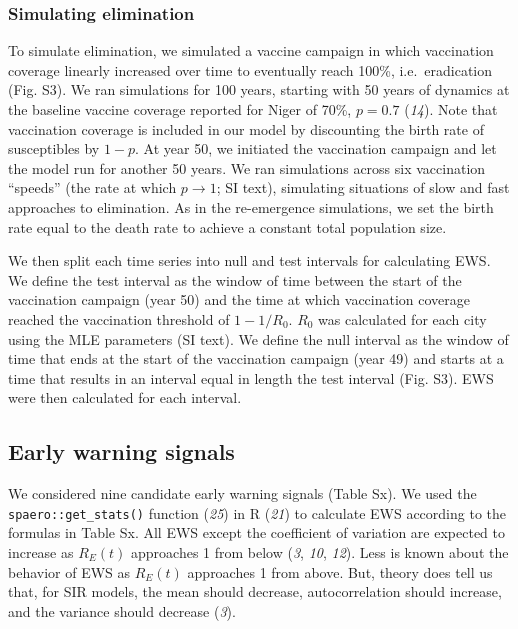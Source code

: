 \documentclass[3p]{elsarticle} %
\begin{document}
\subsubsection{Simulating elimination}\label{simulating-elimination}

To simulate elimination, we simulated a vaccine campaign in which
vaccination coverage linearly increased over time to eventually reach
100\%, i.e.~eradication (Fig. S3). We ran simulations for 100 years,
starting with 50 years of dynamics at the baseline vaccine coverage
reported for Niger of 70\%, \(p = 0.7\) (\emph{14}). Note that
vaccination coverage is included in our model by discounting the birth
rate of susceptibles by \(1-p\). At year 50, we initiated the
vaccination campaign and let the model run for another 50 years. We ran
simulations across six vaccination ``speeds'' (the rate at which
\(p \rightarrow 1\); SI text), simulating situations of slow and fast
approaches to elimination. As in the re-emergence simulations, we set
the birth rate equal to the death rate to achieve a constant total
population size.

We then split each time series into null and test intervals for
calculating EWS. We define the test interval as the window of time
between the start of the vaccination campaign (year 50) and the time at
which vaccination coverage reached the vaccination threshold of
\(1 - 1/R_0\). \(R_0\) was calculated for each city using the MLE
parameters (SI text). We define the null interval as the window of time
that ends at the start of the vaccination campaign (year 49) and starts
at a time that results in an interval equal in length the test interval
(Fig. S3). EWS were then calculated for each interval.

\subsection{Early warning signals}\label{early-warning-signals}

We considered nine candidate early warning signals (Table Sx). We used
the \texttt{spaero::get\_stats()} function (\emph{25}) in R (\emph{21})
to calculate EWS according to the formulas in Table Sx. All EWS except
the coefficient of variation are expected to increase as \(R_E(t)\)
approaches 1 from below (\emph{3}, \emph{10}, \emph{12}). Less is known
about the behavior of EWS as \(R_E(t)\) approaches 1 from above. But,
theory does tell us that, for SIR models, the mean should decrease,
autocorrelation should increase, and the variance should decrease
(\emph{3}).
\end{document}
